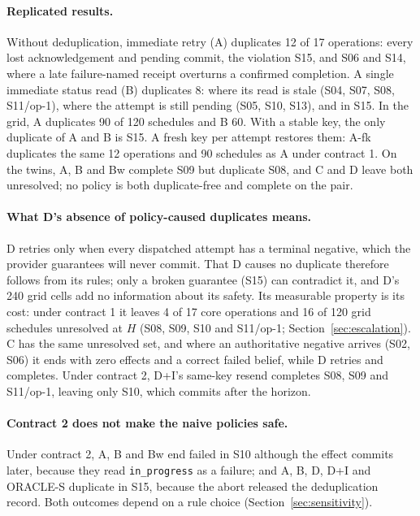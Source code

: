 \documentclass[11pt]{article}
\newcommand{\code}[1]{\texttt{#1}}
\begin{document}
\paragraph{Replicated results.} Without deduplication, immediate retry (A) duplicates 12 of 17 operations: every lost acknowledgement and pending commit, the violation S15, and S06 and S14, where a late failure-named receipt overturns a confirmed completion. A single immediate status read (B) duplicates 8: where its read is stale (S04, S07, S08, S11/op-1), where the attempt is still pending (S05, S10, S13), and in S15. In the grid, A duplicates 90 of 120 schedules and B 60. With a stable key, the only duplicate of A and B is S15. A fresh key per attempt restores them: A-fk duplicates the same 12 operations and 90 schedules as A under contract 1. On the twins, A, B and Bw complete S09 but duplicate S08, and C and D leave both unresolved; no policy is both duplicate-free and complete on the pair.

\paragraph{What D's absence of policy-caused duplicates means.} D retries only when every dispatched attempt has a terminal negative, which the provider guarantees will never commit. That D causes no duplicate therefore follows from its rules; only a broken guarantee (S15) can contradict it, and D's 240 grid cells add no information about its safety. Its measurable property is its cost: under contract 1 it leaves 4 of 17 core operations and 16 of 120 grid schedules unresolved at $H$ (S08, S09, S10 and S11/op-1; Section~\ref{sec:escalation}). C has the same unresolved set, and where an authoritative negative arrives (S02, S06) it ends with zero effects and a correct failed belief, while D retries and completes. Under contract 2, D+I's same-key resend completes S08, S09 and S11/op-1, leaving only S10, which commits after the horizon.

\paragraph{Contract 2 does not make the naive policies safe.} Under contract 2, A, B and Bw end failed in S10 although the effect commits later, because they read \code{in\_progress} as a failure; and A, B, D, D+I and ORACLE-S duplicate in S15, because the abort released the deduplication record. Both outcomes depend on a rule choice (Section~\ref{sec:sensitivity}).
\end{document}
